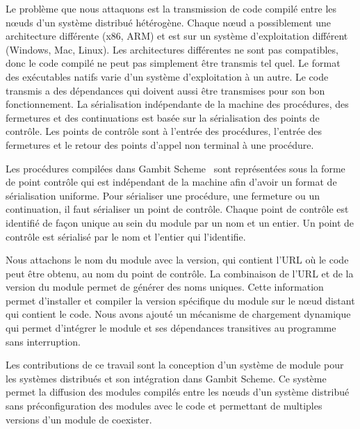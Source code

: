 Le problème que nous attaquons est la transmission de code compilé
entre les nœuds d'un système distribué hétérogène. Chaque nœud a
possiblement une architecture différente (x86, ARM) et est sur un
système d'exploitation différent (Windows, Mac, Linux).
Les architectures différentes ne sont pas compatibles, donc
le code compilé ne peut pas simplement être transmis tel quel.
Le format des exécutables natifs varie d'un système d'exploitation
à un autre. Le code transmis a des dépendances qui doivent aussi être
transmises pour son bon fonctionnement.
La sérialisation indépendante de la machine des procédures, des fermetures et
des continuations est basée sur la sérialisation des points de contrôle. Les
points de contrôle sont à l'entrée des procédures, l'entrée des fermetures
et le retour des points d'appel non terminal à une procédure.

Les procédures compilées dans Gambit Scheme~\cite{gambitdoc} sont représentées
sous la forme de point contrôle qui est indépendant de la machine afin d'avoir
un format de sérialisation uniforme. Pour sérialiser une procédure, une
fermeture ou un continuation, il faut sérialiser un point de contrôle. Chaque
point de contrôle est identifié de façon unique au sein du module par un nom et
un entier. Un point de contrôle est sérialisé par le nom et l'entier qui
l'identifie.

Nous attachons le nom du module avec la version, qui contient l'URL où le code
peut être obtenu, au nom du point de contrôle. La combinaison de l'URL et de la
version du module permet de générer des noms uniques. Cette information permet
d'installer et compiler la version spécifique du module sur le nœud distant qui
contient le code.  Nous avons ajouté un mécanisme de chargement dynamique qui
permet d'intégrer le module et ses dépendances transitives au programme sans
interruption.

Les contributions de ce travail sont la conception d'un système de module pour
les systèmes distribués et son intégration dans Gambit Scheme. Ce système
permet la diffusion des modules compilés entre les nœuds d'un système
distribué sans préconfiguration des modules avec le code et permettant
de multiples versions d'un module de coexister.

